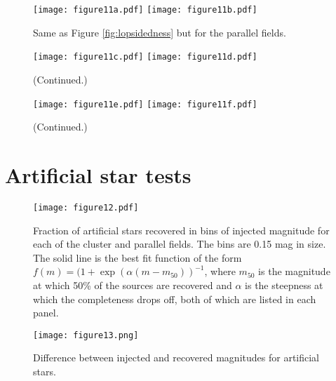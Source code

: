 \documentclass[iop,tighten,twocolumn,apj,floatfix]{emulateapj}
\begin{document}
\begin{figure*}
	\texttt{[image: figure11a.pdf]}
	\texttt{[image: figure11b.pdf]}
	\caption{
    Same as Figure \ref{fig:lopsidedness} but for the parallel fields.
    \label{fig:lopsidedness-parallel}
	}
\end{figure*}
\begin{figure*}
    \ContinuedFloat
	\texttt{[image: figure11c.pdf]}
	\texttt{[image: figure11d.pdf]}
    \caption{(Continued.)}
\end{figure*}
\begin{figure*}
    \ContinuedFloat
	\texttt{[image: figure11e.pdf]}
	\texttt{[image: figure11f.pdf]}
    \caption{(Continued.)}
\end{figure*}

\section{Artificial star tests}\label{sec:artstartests}

\begin{figure*}
	\texttt{[image: figure12.pdf]}
	\caption{
    Fraction of artificial stars recovered in bins of injected magnitude for
    each of the cluster and parallel fields. The bins are 0.15 mag in size.
    The solid line is the best fit function of the form $f(m) = (1 +
    \exp(\alpha(m - m_{50}))^{-1}$, where $m_{50}$ is the magnitude at which
    50\% of the sources are recovered and $\alpha$ is the steepness at which
    the completeness drops off, both of which are listed in each panel.
    \label{fig:starcompleteness}
    }
\end{figure*}

\begin{figure*}
	\texttt{[image: figure13.png]}
	\caption{
    Difference between injected and recovered magnitudes for artificial stars.
    \label{fig:magerr}
    }
\end{figure*}
\end{document}
